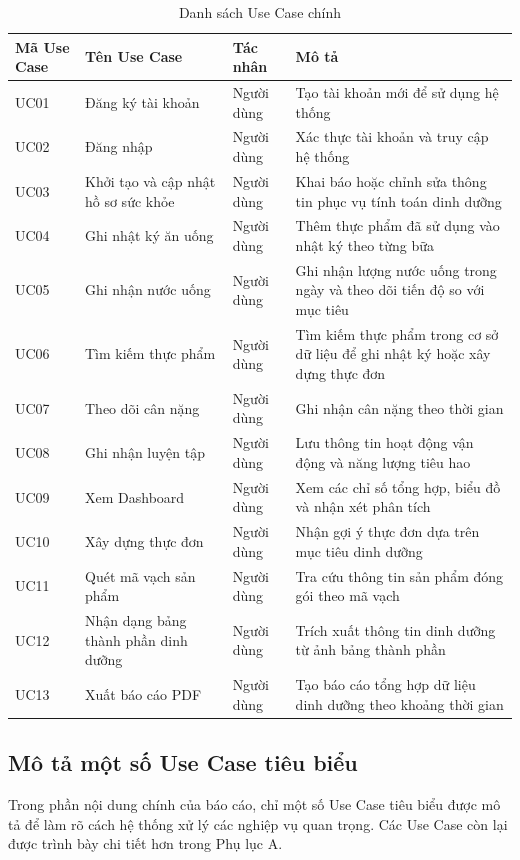 \documentclass[12pt, a4paper]{report}
\begin{document}
\begin{table}[htbp]
\centering
\caption{Danh sách Use Case chính}
\begin{tabular}{|p{3cm}|p{3cm}|p{4cm}|p{5cm}|}
\hline
\textbf{Mã Use Case} & \textbf{Tên Use Case} & \textbf{Tác nhân} & \textbf{Mô tả} \\
\hline
UC01 & Đăng ký tài khoản & Người dùng & Tạo tài khoản mới để sử dụng hệ thống \\
\hline
UC02 & Đăng nhập & Người dùng & Xác thực tài khoản và truy cập hệ thống \\
\hline
UC03 & Khởi tạo và cập nhật hồ sơ sức khỏe & Người dùng & Khai báo hoặc chỉnh sửa thông tin phục vụ tính toán dinh dưỡng \\
\hline
UC04 & Ghi nhật ký ăn uống & Người dùng & Thêm thực phẩm đã sử dụng vào nhật ký theo từng bữa \\
\hline
UC05 & Ghi nhận nước uống & Người dùng & Ghi nhận lượng nước uống trong ngày và theo dõi tiến độ so với mục tiêu \\
\hline
UC06 & Tìm kiếm thực phẩm & Người dùng & Tìm kiếm thực phẩm trong cơ sở dữ liệu để ghi nhật ký hoặc xây dựng thực đơn \\
\hline
UC07 & Theo dõi cân nặng & Người dùng & Ghi nhận cân nặng theo thời gian \\
\hline
UC08 & Ghi nhận luyện tập & Người dùng & Lưu thông tin hoạt động vận động và năng lượng tiêu hao \\
\hline
UC09 & Xem Dashboard & Người dùng & Xem các chỉ số tổng hợp, biểu đồ và nhận xét phân tích \\
\hline
UC10 & Xây dựng thực đơn & Người dùng & Nhận gợi ý thực đơn dựa trên mục tiêu dinh dưỡng \\
\hline
UC11 & Quét mã vạch sản phẩm & Người dùng & Tra cứu thông tin sản phẩm đóng gói theo mã vạch \\
\hline
UC12 & Nhận dạng bảng thành phần dinh dưỡng & Người dùng & Trích xuất thông tin dinh dưỡng từ ảnh bảng thành phần \\
\hline
UC13 & Xuất báo cáo PDF & Người dùng & Tạo báo cáo tổng hợp dữ liệu dinh dưỡng theo khoảng thời gian \\
\hline
\end{tabular}
\end{table}
\subsection{Mô tả một số Use Case tiêu biểu}Trong phần nội dung chính của báo cáo, chỉ một số Use Case tiêu biểu được mô tả để làm rõ cách hệ thống xử lý các nghiệp vụ quan trọng. Các Use Case còn lại được trình bày chi tiết hơn trong Phụ lục A.
\end{document}
